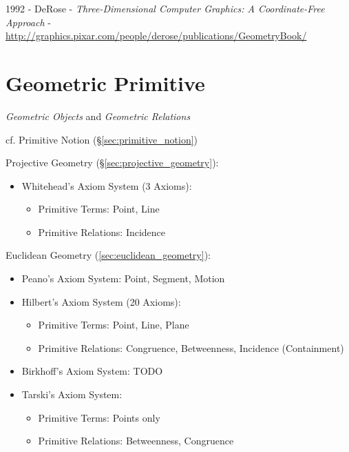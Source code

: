 1992 - DeRose - \emph{Three-Dimensional Computer Graphics: A Coordinate-Free
  Approach} -
\url{http://graphics.pixar.com/people/derose/publications/GeometryBook/}



\section{Geometric Primitive}\label{sec:geometric_primitive}

\emph{Geometric Objects} and \emph{Geometric Relations}

cf. Primitive Notion (\S\ref{sec:primitive_notion})

Projective Geometry (\S\ref{sec:projective_geometry}):
\begin{itemize}
  \item Whitehead's Axiom System (3 Axioms):
    \begin{itemize}
      \item Primitive Terms: Point, Line
      \item Primitive Relations: Incidence
    \end{itemize}
\end{itemize}

Euclidean Geometry (\ref{sec:euclidean_geometry}):
\begin{itemize}
  \item Peano's Axiom System: Point, Segment, Motion
  \item Hilbert's Axiom System (20 Axioms):
    \begin{itemize}
      \item Primitive Terms: Point, Line, Plane
      \item Primitive Relations: Congruence, Betweenness,
        Incidence (Containment)
    \end{itemize}
  \item Birkhoff's Axiom System: TODO
  \item Tarski's Axiom System:
    \begin{itemize}
      \item Primitive Terms: Points only
      \item Primitive Relations: Betweenness, Congruence
    \end{itemize}
\end{itemize}



